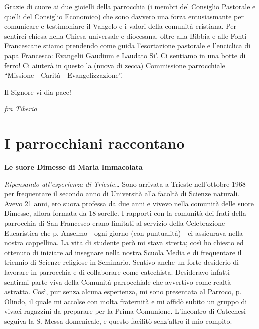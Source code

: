 Grazie di cuore ai due gioielli della parrocchia (i membri del Consiglio Pastorale e quelli del 
Consiglio Economico) che sono davvero una forza entusiasmante per comunicare e testimoniare il 
Vangelo e i valori della comunità cristiana. Per sentirci chiesa nella Chiesa universale e diocesana, 
oltre alla Bibbia e alle Fonti Francescane stiamo prendendo come guida l’esortazione pastorale e 
l’enciclica di papa Francesco: Evangelii Gaudium e Laudato Si’. Ci sentiamo in una botte di ferro! 
Ci aiuterà in questo la (nuova di zecca) Commissione parrocchiale “Missione - Carità - 
Evangelizzazione”.

Il Signore vi dia pace!
\begin{flushright}
\textit{fra Tiberio}
\end{flushright}

\chapter{I parrocchiani raccontano}
\begin{center}
\textbf{\Large Le suore Dimesse di Maria Immacolata}
\end{center}
\bigbreak
\textit{Ripensando all’esperienza di Trieste…}
\medbreak
Sono arrivata a Trieste nell’ottobre 1968 per frequentare il secondo anno di Università alla
facoltà di Scienze naturali. Avevo 21 anni, ero suora professa da due anni e vivevo nella comunità 
delle suore Dimesse, allora formata da 18 sorelle. I rapporti con la comunità dei frati della 
parrocchia di San Francesco erano limitati al servizio della Celebrazione Eucaristica che p. 
Anselmo - ogni giorno (con puntualità) - ci assicurava nella nostra cappellina. La vita di studente 
però mi stava stretta; così ho chiesto ed ottenuto di iniziare ad insegnare nella nostra Scuola Media 
e di frequentare il triennio di Scienze religiose in Seminario. Sentivo anche un forte desiderio di 
lavorare in parrocchia e di collaborare come catechista. Desideravo infatti sentirmi parte viva della 
Comunità parrocchiale che avvertivo come realtà astratta. Così, pur senza alcuna esperienza, mi 
sono presentata al Parroco, p. Olindo, il quale mi accolse con molta fraternità e mi affidò subito un 
gruppo di vivaci ragazzini da preparare per la Prima Comunione. L’incontro di Catechesi seguiva la 
S. Messa domenicale, e questo facilitò senz’altro il mio compito. 

